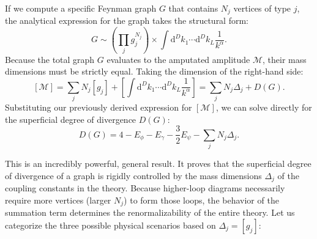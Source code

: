 If we compute a specific Feynman graph $G$ that contains $N_j$ vertices of type $j$, the analytical expression for the graph takes the structural form:
\[
    G \sim \left( \prod_j g_j^{N_j} \right) \times \int \mathrm{d}^D k_1 \cdots \mathrm{d}^D k_L \frac{1}{k^\alpha}.
\]
Because the total graph $G$ evaluates to the amputated amplitude $\mathcal{M}$, their mass dimensions must be strictly equal. Taking the dimension of the right-hand side:
\[
    [\mathcal{M}] = \sum_j N_j [g_j] + \left[ \int \mathrm{d}^D k_1 \cdots \mathrm{d}^D k_L \frac{1}{k^\alpha} \right] = \sum_j N_j \Delta_j + D(G).
\]
Substituting our previously derived expression for $[\mathcal{M}]$, we can solve directly for the superficial degree of divergence $D(G)$:
\[
    D(G) = 4 - E_\phi - E_\gamma - \frac{3}{2}E_\psi - \sum_j N_j \Delta_j.
\]

This is an incredibly powerful, general result. It proves that the superficial degree of divergence of a graph is rigidly controlled by the mass dimensions $\Delta_j$ of the coupling constants in the theory. Because higher-loop diagrams necessarily require more vertices (larger $N_j$) to form those loops, the behavior of the summation term determines the renormalizability of the entire theory. Let us categorize the three possible physical scenarios based on $\Delta_j = [g_j]$:

